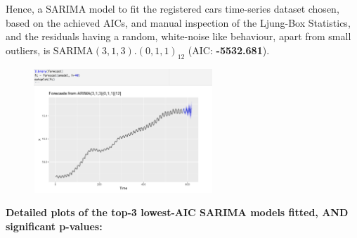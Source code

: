 \documentclass[a4paper,11pt]{article}
\begin{document}
    Hence, a SARIMA model to fit the registered cars time-series dataset chosen, based on the achieved AICs, and manual inspection of the Ljung-Box Statistics, and the residuals having a random, white-noise like behaviour, apart from small outliers, is $\text{SARIMA}(3,1,3).(0,1,1)_{12}$ (AIC: \textbf{-5532.681}). 

    \vspace{-10pt}
    \begin{figure}[H]
        \centering
        \includegraphics[width=0.6\textwidth]{figure-markdown_strict/forecast.png}
        \label{fig:forecast}
    \end{figure}

    \newpage
    \textbf{Detailed plots of the top-3 lowest-AIC SARIMA models fitted, AND significant p-values:}
\end{document}
